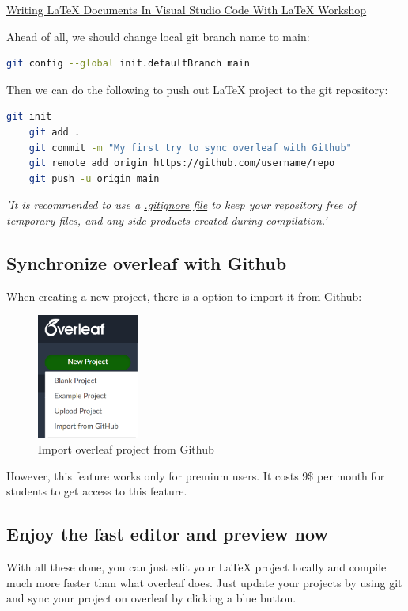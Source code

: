 \href{https://medium.com/@rcpassos/writing-latex-documents-in-visual-studio-code-with-latex-workshop-d9af6a6b2815}{Writing LaTeX Documents In Visual Studio Code With LaTeX Workshop} 

Ahead of all, we should change local git branch name to main:

\begin{lstlisting}[language=bash]
    git config --global init.defaultBranch main
\end{lstlisting}

Then we can do the following to push out LaTeX project to the git repository:

\begin{lstlisting}[language=bash]
    git init
    git add .
    git commit -m "My first try to sync overleaf with Github"
    git remote add origin https://github.com/username/repo
    git push -u origin main
\end{lstlisting}

\emph{'It is recommended to use a \href{https://github.com/github/gitignore/blob/main/TeX.gitignore}{.gitignore file} to keep your repository free of temporary files, and any side products created during compilation.'}

\subsection*{Synchronize overleaf with Github}

When creating a new project, there is a option to import it from Github:

\begin{figure}[h]
\centering
\includegraphics[width=0.3\textwidth]{./2023Mar/Import-From-Github.png}
\caption{Import overleaf project from Github}
\label{importfromgithub}
\end{figure}

However, this feature works only for premium users. It costs 9\$ per month for students to get access to this feature.

\subsection*{Enjoy the fast editor and preview now}

With all these done, you can just edit your LaTeX project locally and compile much more faster than what overleaf does. Just update your projects by using git and sync your project on overleaf by clicking a blue button.

